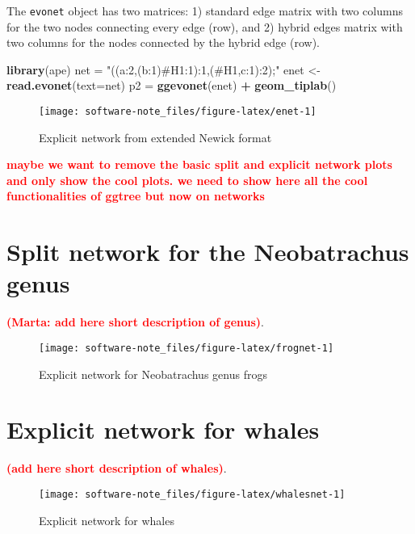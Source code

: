 \documentclass[]{IEEEtran}
\newenvironment{Shaded}{\begin{snugshade}}{\end{snugshade}}
\newcommand{\DataTypeTok}[1]{\textcolor[rgb]{0.13,0.29,0.53}{#1}}
\newcommand{\KeywordTok}[1]{\textcolor[rgb]{0.13,0.29,0.53}{\textbf{#1}}}
\newcommand{\NormalTok}[1]{#1}
\newcommand{\OperatorTok}[1]{\textcolor[rgb]{0.81,0.36,0.00}{\textbf{#1}}}
\newcommand{\StringTok}[1]{\textcolor[rgb]{0.31,0.60,0.02}{#1}}
\begin{document}
The \texttt{evonet} object has two matrices: 1) standard edge matrix
with two columns for the two nodes connecting every edge (row), and 2)
hybrid edges matrix with two columns for the nodes connected by the
hybrid edge (row).

\begin{Shaded}
\begin{Highlighting}[]
\KeywordTok{library}\NormalTok{(ape)}
\NormalTok{net =}\StringTok{ "((a:2,(b:1)#H1:1):1,(#H1,c:1):2);"}
\NormalTok{enet <-}\StringTok{ }\KeywordTok{read.evonet}\NormalTok{(}\DataTypeTok{text=}\NormalTok{net)}
\NormalTok{p2 =}\StringTok{ }\KeywordTok{ggevonet}\NormalTok{(enet) }\OperatorTok{+}\StringTok{ }\KeywordTok{geom_tiplab}\NormalTok{() }
\end{Highlighting}
\end{Shaded}

\begin{figure}[H]

{\centering \texttt{[image: software-note\_files/figure-latex/enet-1]} 

}

\caption{Explicit network from extended Newick format}\label{fig:enet}
\end{figure}

\textcolor{red}{\textbf{maybe we want to remove the basic split and explicit network plots and only show the cool plots. we need to show here all the cool functionalities of ggtree but now on networks}}

\hypertarget{split-network-for-the-neobatrachus-genus}{%
\section{Split network for the Neobatrachus
genus}\label{split-network-for-the-neobatrachus-genus}}

\textcolor{red}{\textbf{(Marta: add here short description of genus)}}.

\begin{figure}[H]

{\centering \texttt{[image: software-note\_files/figure-latex/frognet-1]} 

}

\caption{Explicit network for Neobatrachus genus frogs}\label{fig:frognet}
\end{figure}

\hypertarget{explicit-network-for-whales}{%
\section{Explicit network for
whales}\label{explicit-network-for-whales}}

\textcolor{red}{\textbf{(add here short description of whales)}}.

\begin{figure}[H]

\texttt{[image: software-note\_files/figure-latex/whalesnet-1]} \hfill{}

\caption{Explicit network for whales}\label{fig:whalesnet}
\end{figure}


\end{document}
